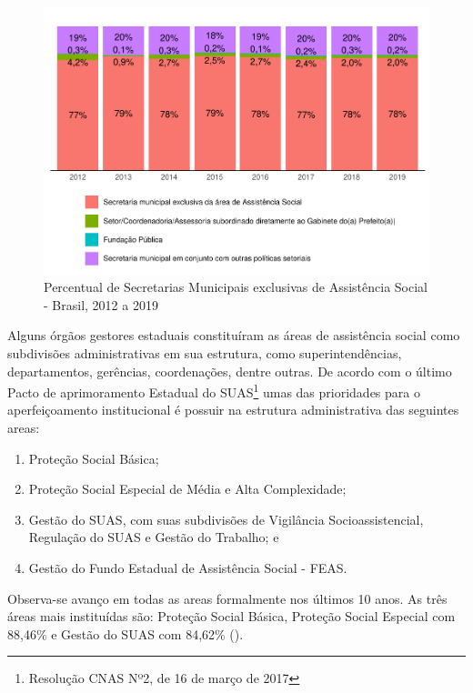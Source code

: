 \documentclass[
  brazilian]{report}
\providecommand{\tightlist}{%
  \setlength{\itemsep}{0pt}\setlength{\parskip}{0pt}}
\begin{document}
\begin{figure}
\includegraphics{Censo-SUAS-2022_files/figure-latex/sec-munic-exc-1} \caption[Percentual de Secretarias Municipais exclusivas de Assistência Social - Brasil, 2012 a 2019]{Percentual de Secretarias Municipais exclusivas de Assistência Social - Brasil, 2012 a 2019}\label{fig:sec-munic-exc}
\end{figure}

Alguns órgãos gestores estaduais constituíram as áreas de assistência
social como subdivisões administrativas em sua estrutura, como
superintendências, departamentos, gerências, coordenações, dentre
outras. De acordo com o último Pacto de aprimoramento Estadual do
SUAS\footnote{Resolução CNAS Nº2, de 16 de março de 2017} umas das
prioridades para o aperfeiçoamento institucional é possuir na estrutura
administrativa das seguintes areas:

\begin{enumerate}
\def\labelenumi{\arabic{enumi})}
\tightlist
\item
  Proteção Social Básica;
\item
  Proteção Social Especial de Média e Alta Complexidade;
\item
  Gestão do SUAS, com suas subdivisões de Vigilância Socioassistencial,
  Regulação do SUAS e Gestão do Trabalho; e
\item
  Gestão do Fundo Estadual de Assistência Social - FEAS.
\end{enumerate}

Observa-se avanço em todas as areas formalmente nos últimos 10 anos. As
três áreas mais instituídas são: Proteção Social Básica, Proteção Social
Especial com 88,46\% e Gestão do SUAS com 84,62\% ().
\end{document}
